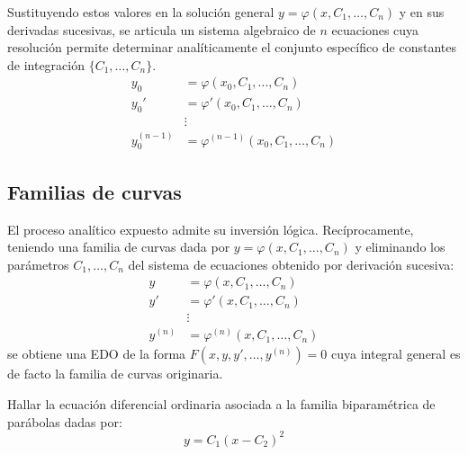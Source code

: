 Sustituyendo estos valores en la solución general $y = \varphi(x, C_1, \dots, C_n)$ y en sus derivadas sucesivas, se articula un sistema algebraico de $n$ ecuaciones cuya resolución permite determinar analíticamente el conjunto específico de constantes de integración $\{C_1, \dots, C_n\}$.
\begin{align*}
    y_0 &= \varphi(x_0, C_1, \dots, C_n) \\
    y_0' &= \varphi'(x_0, C_1, \dots, C_n) \\
    &\vdots \\
    y_0^{(n-1)} &= \varphi^{(n-1)}(x_0, C_1, \dots, C_n)
\end{align*}

\subsection{Familias de curvas}

El proceso analítico expuesto admite su inversión lógica. Recíprocamente, teniendo una familia de curvas dada por $y = \varphi(x, C_1, \dots, C_n)$ y eliminando los parámetros $C_1, \dots, C_n$ del sistema de ecuaciones obtenido por derivación sucesiva:
\begin{align*}
    y &= \varphi(x, C_1, \dots, C_n) \\
    y' &= \varphi'(x, C_1, \dots, C_n) \\
    &\vdots \\
    y^{(n)} &= \varphi^{(n)}(x, C_1, \dots, C_n)
\end{align*}
se obtiene una EDO de la forma $F(x, y, y', \dots, y^{(n)}) = 0$ cuya integral general es de facto la familia de curvas originaria.

\vspace{0.5cm}

\begin{ejercicio}
Hallar la ecuación diferencial ordinaria asociada a la familia biparamétrica de parábolas dadas por:
$$ y = C_1(x - C_2)^2 $$
\end{ejercicio}

